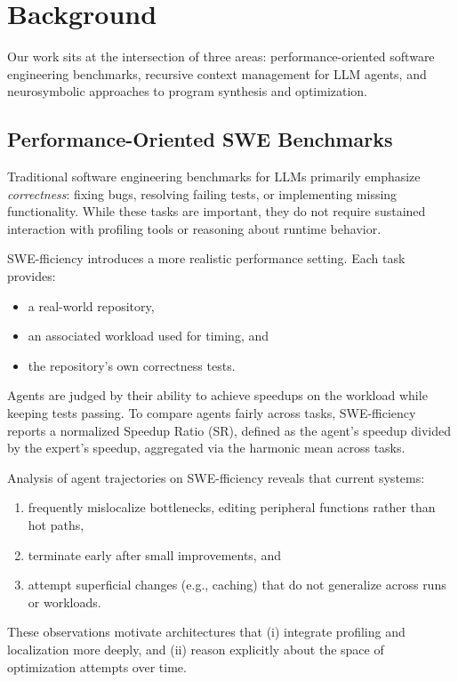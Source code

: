 \documentclass{article}
\theoremstyle{plain}
\theoremstyle{definition}
\theoremstyle{remark}
\begin{document}
\section{Background}
\label{sec:background}
Our work sits at the intersection of three areas: performance-oriented software engineering benchmarks, recursive context management for LLM agents, and neurosymbolic approaches to program synthesis and optimization.

\subsection{Performance-Oriented SWE Benchmarks}
Traditional software engineering benchmarks for LLMs primarily emphasize \emph{correctness}: fixing bugs, resolving failing tests, or implementing missing functionality. While these tasks are important, they do not require sustained interaction with profiling tools or reasoning about runtime behavior.

SWE-fficiency introduces a more realistic performance setting. Each task provides:
\begin{itemize}
    \item a real-world repository,
    \item an associated workload used for timing, and
    \item the repository's own correctness tests.
\end{itemize}
Agents are judged by their ability to achieve speedups on the workload while keeping tests passing. To compare agents fairly across tasks, SWE-fficiency reports a normalized Speedup Ratio (SR), defined as the agent's speedup divided by the expert's speedup, aggregated via the harmonic mean across tasks.

Analysis of agent trajectories on SWE-fficiency reveals that current systems:
\begin{enumerate}
    \item frequently mislocalize bottlenecks, editing peripheral functions rather than hot paths,
    \item terminate early after small improvements, and
    \item attempt superficial changes (e.g., caching) that do not generalize across runs or workloads.
\end{enumerate}
These observations motivate architectures that (i) integrate profiling and localization more deeply, and (ii) reason explicitly about the space of optimization attempts over time.
\end{document}
